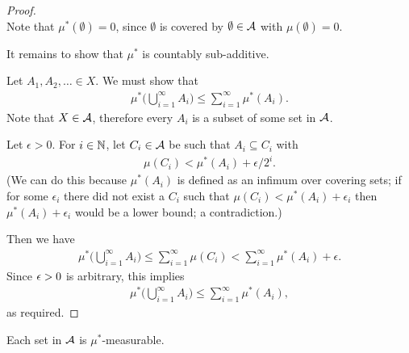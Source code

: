 \begin{proof}~\\
  Note that $\mu^*(\emptyset) = 0$, since $\emptyset$ is covered by $\emptyset \in \mathcal A$ with $\mu(\emptyset) = 0$.

  It remains to show that $\mu^*$ is countably sub-additive.

  Let $A_1, A_2, \ldots \in X$. We must show that
  \begin{align*}
    \mu^*\Big(\bigcup_{i=1}^\infty A_i\Big) \leq \sum_{i=1}^\infty \mu^*(A_i).
  \end{align*}
  Note that $X \in \mathcal A$, therefore every $A_i$ is a subset of some set in $\mathcal A$.

  Let $\epsilon > 0$. For $i \in \mathbb{N}$, let $C_i \in \mathcal A$ be such that $A_i \subseteq C_{i}$ with
  \begin{align*}
    \mu(C_{i}) < \mu^*(A_i) + \epsilon/2^i.
  \end{align*}
  (We can do this because $\mu^*(A_i)$ is defined as an infimum over covering sets; if for some $\epsilon_i$
  there did not exist a $C_i$ such that $\mu(C_{i}) < \mu^*(A_i) + \epsilon_i$ then $\mu^*(A_i) + \epsilon_i$
  would be a lower bound; a contradiction.)

  Then we have
  \begin{align*}
    \mu^*\Big(\bigcup_{i=1}^\infty A_i\Big) \leq \sum_{i=1}^\infty \mu(C_{i}) < \sum_{i=1}^\infty \mu^*(A_i) + \epsilon.
  \end{align*}
  Since $\epsilon > 0$ is arbitrary, this implies
  \begin{align*}
    \mu^*\Big(\bigcup_{i=1}^\infty A_i\Big) \leq \sum_{i=1}^\infty \mu^*(A_i),
  \end{align*}
  as required.
\end{proof}






















\begin{claim*}
  Each set in $\mathcal A$ is $\mu^*$-measurable.
\end{claim*}

